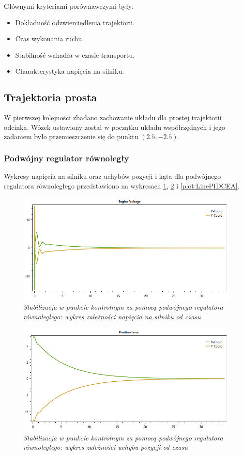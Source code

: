 \documentclass[12pt, twoside, openany]{report}
\theoremstyle{definition}
\begin{document}
Głównymi kryteriami porównawczymi były: 
\begin{itemize}
\item Dokładność odzwierciedlenia trajektorii.
\item Czas wykonania ruchu.
\item Stabilność wahadła w czasie transportu.
\item Charakterystyka napięcia na silniku.
\end{itemize}

\subsection{Trajektoria prosta}
W pierwszej kolejności zbadano zachowanie układu dla prostej trajektorii odcinka. Wózek ustawiony został w początku układu współrzędnych i jego zadaniem było przemieszczenie się do punktu $(2.5,-2.5)$.

\subsubsection{Podwójny regulator równoległy}
Wykresy napięcia na silniku oraz uchybów pozycji i kąta dla podwójnego regulatora równoległego przedstawiono na wykresach \ref{plot:LinePIDEV}, \ref{plot:LinePIDCEP} i \ref{plot:LinePIDCEA}.

\begin{figure}[H]
	\centering
		\includegraphics[width = 350pt]{LinePIDEV} 
		\caption{\textit{Stabilizacja w punkcie kontrolnym za pomocą podwójnego regulatora równoległego: wykres zależności napięcia na silniku od czasu}}
		\label{plot:LinePIDEV}
\end{figure}

\begin{figure}[H]
	\centering
		\includegraphics[width = 350pt]{LinePIDCEP} 
		\caption{\textit{Stabilizacja w punkcie kontrolnym za pomocą podwójnego regulatora równoległego: wykres zależności uchybu pozycji od czasu}}
		\label{plot:LinePIDCEP}
\end{figure}
\end{document}
